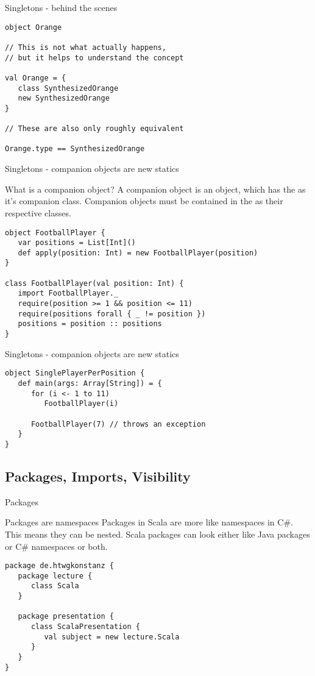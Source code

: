 \begin{frame}[fragile]{Singletons - behind the scenes}
\begin{lstlisting}
object Orange

// This is not what actually happens,
// but it helps to understand the concept

val Orange = {
   class SynthesizedOrange
   new SynthesizedOrange
}

// These are also only roughly equivalent

Orange.type == SynthesizedOrange
\end{lstlisting}

\end{frame}

\begin{frame}[fragile]{Singletons - companion objects are new statics}
\begin{block}{What is a companion object?}
A companion object is an object, which has the  as it's
companion class. Companion objects \alert{must} be contained in the
 as their respective classes.
\end{block}
\pause
\begin{lstlisting}
object FootballPlayer {
   var positions = List[Int]()
   def apply(position: Int) = new FootballPlayer(position)
}

class FootballPlayer(val position: Int) {
   import FootballPlayer._
   require(position >= 1 && position <= 11)
   require(positions forall { _ != position })
   positions = position :: positions
}
\end{lstlisting}
\end{frame}

\begin{frame}[fragile]{Singletons - companion objects are new statics}
\begin{lstlisting}
object SinglePlayerPerPosition {
   def main(args: Array[String]) = {
      for (i <- 1 to 11)
         FootballPlayer(i)

      FootballPlayer(7) // throws an exception
   }
}
\end{lstlisting}
\end{frame}

\subsection{Packages, Imports, Visibility}

\begin{frame}[fragile]{Packages}
\begin{block}{Packages are namespaces}
Packages in Scala are more like namespaces in C\#. This means they can be
nested. Scala packages can look either like Java packages or C\# namespaces or
both.
\end{block}
\pause
\begin{lstlisting}
package de.htwgkonstanz {
   package lecture {
      class Scala
   }
   
   package presentation {
      class ScalaPresentation {
         val subject = new lecture.Scala
      }
   }
}
\end{lstlisting}
\end{frame}

